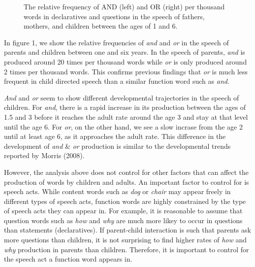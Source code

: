 \documentclass[10pt, letterpaper]{article}
\newenvironment{CodeChunk}{}{}
\begin{document}
\begin{CodeChunk}
\begin{figure}[t]
{}

\caption[The relative frequency of AND (left) and OR (right) per thousand words in declaratives and questions in the speech of fathers, mothers, and children between the ages of 1 and 6]{The relative frequency of AND (left) and OR (right) per thousand words in declaratives and questions in the speech of fathers, mothers, and children between the ages of 1 and 6.}\label{fig:byspeechActPlots}
\end{figure}
\end{CodeChunk}

In figure 1, we show the relative frequencies of \emph{and} and
\emph{or} in the speech of parents and children between one and six
years. In the speech of parents, \emph{and} is produced around 20 times
per thousand words while \emph{or} is only produced around 2 times per
thousand words. This confirms previous findings that \emph{or} is much
less frequent in child directed speech than a similar function word such
as \emph{and}.

\emph{And} and \emph{or} seem to show different developmental
trajectories in the speech of children. For \emph{and}, there is a rapid
increase in its production between the ages of 1.5 and 3 before it
reaches the adult rate around the age 3 and stay at that level until the
age 6. For \emph{or}, on the other hand, we see a slow incrase from the
age 2 until at least age 6, as it approaches the adult rate. This
difference in the development of \emph{and} \& \emph{or} production is
similar to the developmental trends reported by Morris (2008).

However, the analysis above does not control for other factors that can
affect the production of words by children and adults. An important
factor to control for is speech acts. While content words such as
\emph{dog} or \emph{chair} may appear freely in different types of
speech acts, function words are highly constrained by the type of speech
acts they can appear in. For example, it is reasonable to assume that
question words such as \emph{how} and \emph{why} are much more likey to
occur in questions than statements (declaratives). If parent-child
interaction is such that parents ask more questions than children, it is
not surprising to find higher rates of \emph{how} and \emph{why}
production in parents than children. Therefore, it is important to
control for the speech act a function word appears in.
\end{document}
